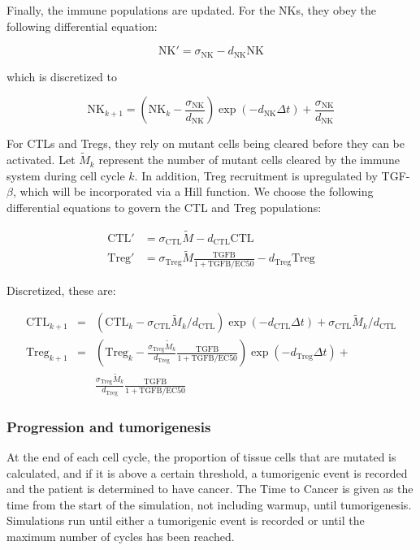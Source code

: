 \documentclass[11pt, preprint]{article}
\begin{document}
Finally, the immune populations are updated.
For the NKs, they obey the following differential equation:
 
$$ \text{NK}' = \sigma_{\text{NK}} - d_{\text{NK}}\text{NK} $$

which is discretized to
 
$$ \text{NK}_{k+1} = \left (\text{NK}_k-\frac{\sigma_{\text{NK}}}{d_{\text{NK}}} \right )\exp(-d_{\text{NK}}\Delta t)+\frac{\sigma_{\text{NK}}}{d_{\text{NK}}} $$


For CTLs and Tregs, they rely on mutant cells being cleared before they can be activated.
Let $\tilde{M}_k$ represent the number of mutant cells cleared by the immune system during cell cycle $k$.
In addition, Treg recruitment is upregulated by TGF-$\beta$, which will be incorporated via a Hill function.
We choose the following differential equations to govern the CTL and Treg populations:

\begin{align*}
\text{CTL}' & = \sigma_{\text{CTL}}\tilde{M} - d_{\text{CTL}}\text{CTL} \\
\text{Treg}' & = \sigma_{\text{Treg}}\tilde{M} \frac{\text{TGFB}}{1+\text{TGFB}/\text{EC50}}- d_{\text{Treg}}\text{Treg}
\end{align*}

Discretized, these are:

\begin{align*}
\text{CTL}_{k+1} & = & \left (\text{CTL}_k-\sigma_{\text{CTL}}\tilde{M}_k/d_{\text{CTL}}\right )\exp(- d_{\text{CTL}}\Delta t) + \sigma_{\text{CTL}}\tilde{M}_k/d_{\text{CTL}}\\
\text{Treg}_{k+1} & = & \left (\text{Treg}_k-\frac{\sigma_{\text{Treg}}\tilde{M}_k}{d_{\text{Treg}}} \frac{\text{TGFB}}{1+\text{TGFB}/\text{EC50}}\right )\exp(-d_{\text{Treg}}\Delta t)+\\
& & \frac{\sigma_{\text{Treg}}\tilde{M}_k}{d_{\text{Treg}}} \frac{\text{TGFB}}{1+\text{TGFB}/\text{EC50}}
\end{align*}

\subsubsection{Progression and tumorigenesis}
At the end of each cell cycle, the proportion of tissue cells that are mutated is calculated, and if it is above a certain threshold, a tumorigenic event is recorded and the patient is determined to have cancer.
The Time to Cancer is given as the time from the start of the simulation, not including warmup, until tumorigenesis.
Simulations run until either a tumorigenic event is recorded or until the maximum number of cycles has been reached.
\end{document}
